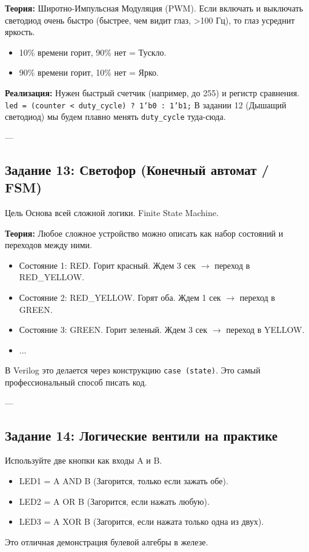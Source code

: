 \documentclass[12pt, a4paper]{article}
\begin{document}
\textbf{Теория:}
Широтно-Импульсная Модуляция (PWM). Если включать и выключать светодиод очень быстро (быстрее, чем видит глаз, >100 Гц), то глаз усреднит яркость.
\begin{itemize}
    \item 10\% времени горит, 90\% нет = Тускло.
    \item 90\% времени горит, 10\% нет = Ярко.
\end{itemize}

\textbf{Реализация:} Нужен быстрый счетчик (например, до 255) и регистр сравнения.
\texttt{led = (counter < duty\_cycle) ? 1'b0 : 1'b1;}
В задании 12 (Дышащий светодиод) мы будем плавно менять \texttt{duty\_cycle} туда-сюда.

---

\subsection{Задание 13: Светофор (Конечный автомат / FSM)}
\begin{taskbox}{Цель}
Основа всей сложной логики. Finite State Machine.
\end{taskbox}

\textbf{Теория:}
Любое сложное устройство можно описать как набор состояний и переходов между ними.
\begin{itemize}
    \item Состояние 1: RED. Горит красный. Ждем 3 сек $\rightarrow$ переход в RED\_YELLOW.
    \item Состояние 2: RED\_YELLOW. Горят оба. Ждем 1 сек $\rightarrow$ переход в GREEN.
    \item Состояние 3: GREEN. Горит зеленый. Ждем 3 сек $\rightarrow$ переход в YELLOW.
    \item ...
\end{itemize}
В Verilog это делается через конструкцию \texttt{case (state)}. Это самый профессиональный способ писать код.

---

\subsection{Задание 14: Логические вентили на практике}
Используйте две кнопки как входы A и B.
\begin{itemize}
    \item LED1 = A AND B (Загорится, только если зажать обе).
    \item LED2 = A OR B (Загорится, если нажать любую).
    \item LED3 = A XOR B (Загорится, если нажата только одна из двух).
\end{itemize}
Это отличная демонстрация булевой алгебры в железе.
\end{document}
